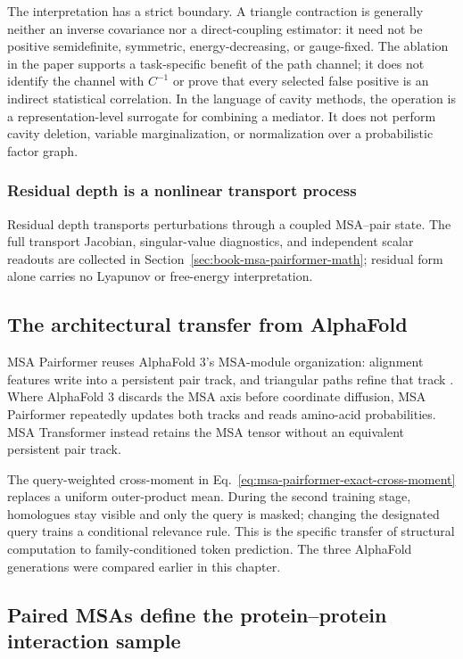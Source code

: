 The interpretation has a strict boundary.  A triangle contraction is generally neither an inverse
covariance nor a direct-coupling estimator: it need not be positive semidefinite, symmetric,
energy-decreasing, or gauge-fixed.  The ablation in the paper supports a task-specific benefit of
the path channel; it does not identify the channel with $C^{-1}$ or prove that every selected false
positive is an indirect statistical correlation.  In the language of cavity methods, the operation
is a representation-level surrogate for combining a mediator.  It does not perform cavity deletion,
variable marginalization, or normalization over a probabilistic factor graph.

\subsubsection{Residual depth is a nonlinear transport process}

Residual depth transports perturbations through a coupled MSA--pair state.  The full transport
Jacobian, singular-value diagnostics, and independent scalar readouts are collected in
Section~\ref{sec:book-msa-pairformer-math}; residual form alone carries no Lyapunov or free-energy
interpretation.
\subsection{The architectural transfer from AlphaFold}

MSA Pairformer reuses AlphaFold 3's MSA-module organization: alignment features write into a
persistent pair track, and triangular paths refine that track \cite{jumper2021,abramson2024}.
Where AlphaFold 3 discards the MSA axis before coordinate diffusion, MSA Pairformer repeatedly
updates both tracks and reads amino-acid probabilities.  MSA Transformer instead retains the MSA
tensor without an equivalent persistent pair track.

The query-weighted cross-moment in Eq.~\ref{eq:msa-pairformer-exact-cross-moment} replaces a
uniform outer-product mean.  During the second training stage, homologues stay visible and only
the query is masked; changing the designated query trains a conditional relevance rule.  This is
the specific transfer of structural computation to family-conditioned token prediction.  The
three AlphaFold generations were compared earlier in this chapter.

\subsection{Paired MSAs define the protein--protein interaction sample}

